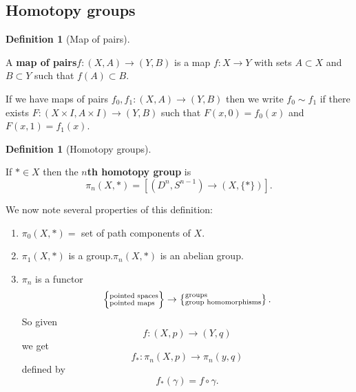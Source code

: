 \documentclass[10pt,]{book}
\newcommand{\terminology}[1]{\textbf{#1}}
\theoremstyle{plain}
\theoremstyle{definition}
\newtheorem{definition}[theorem]{Definition}
\numberwithin{equation}{section}
\begin{document}
\subsection[Homotopy groups]{Homotopy groups}\label{subsection-2}
\begin{definition}[Map of pairs]\label{definition-4}

              A \terminology{map of pairs}\(f\colon (X, A) \to (Y, B)\) is a map \(f\colon X
              \to Y\) with sets \(A\subset X\) and \(B\subset Y\) such that \(f(A)\subset
              B\).

              If we have maps of pairs \(f_0, f_1\colon (X,A) \to (Y,B)\) then we
              write \(f_0\sim f_1\) if there exists \(F\colon(X\times I, A\times I) \to
              (Y,B)\) such that \(F(x,0) = f_0(x)\) and \(F(x,1) = f_1(x)\).
            \end{definition}
\begin{definition}[Homotopy groups]\label{definition-5}

              If \(*\in X\) then the \terminology{\(n\)th homotopy group} is
              \[\pi_n(X, *) = [(D^n, S^{n-1}) \to (X, \{*\})].\]\end{definition}

            We now note several properties of this definition:
            \begin{enumerate}
\item{}\(\pi_0(X, *) =\) set of path components of \(X\).\item{}\(\pi_1(X, *)\) is a group.\(\pi_n(X, *)\) is an abelian group. \item{}\(\pi_n\) is a functor
                \[
                  \left\{ \begin{subarray}{l}\text{pointed spaces} \\ \text{pointed
                  maps} \end{subarray}\right\} \to \left\{\begin{subarray}{l}
                  \text{groups}\\ \text{group homomorphisms}\end{subarray}\right\}.
                \]
                So given
                \[f\colon(X, p)\to(Y,q)\]
                we get
                \[f_*\colon \pi_n(X,p)\to\pi_n(y,q)\]
                defined by
                \[f_*(\gamma) = f\circ \gamma.\]
                
              \end{enumerate}
\end{document}
